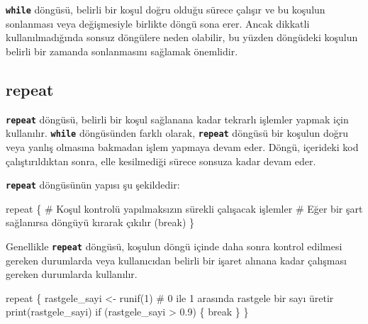 \documentclass[
  letterpaper,
  DIV=11,
  numbers=noendperiod]{scrreprt}
\newenvironment{Shaded}{\begin{snugshade}}{\end{snugshade}}
\newcommand{\CommentTok}[1]{\textcolor[rgb]{0.37,0.37,0.37}{#1}}
\newcommand{\ControlFlowTok}[1]{\textcolor[rgb]{0.00,0.23,0.31}{#1}}
\newcommand{\DecValTok}[1]{\textcolor[rgb]{0.68,0.00,0.00}{#1}}
\newcommand{\FloatTok}[1]{\textcolor[rgb]{0.68,0.00,0.00}{#1}}
\newcommand{\FunctionTok}[1]{\textcolor[rgb]{0.28,0.35,0.67}{#1}}
\newcommand{\NormalTok}[1]{\textcolor[rgb]{0.00,0.23,0.31}{#1}}
\newcommand{\OtherTok}[1]{\textcolor[rgb]{0.00,0.23,0.31}{#1}}
\newcommand{\SpecialCharTok}[1]{\textcolor[rgb]{0.37,0.37,0.37}{#1}}
\begin{document}
\begin{tcolorbox}[enhanced jigsaw, colback=white, coltitle=black, colbacktitle=quarto-callout-warning-color!10!white, opacitybacktitle=0.6, opacityback=0, toprule=.15mm, bottomrule=.15mm, bottomtitle=1mm, rightrule=.15mm, breakable, arc=.35mm, colframe=quarto-callout-warning-color-frame, titlerule=0mm, left=2mm, leftrule=.75mm, toptitle=1mm, title=\textcolor{quarto-callout-warning-color}{\faExclamationTriangle}\hspace{0.5em}{Uyarı}]

\textbf{\texttt{while}} döngüsü, belirli bir koşul doğru olduğu sürece
çalışır ve bu koşulun sonlanması veya değişmesiyle birlikte döngü sona
erer. Ancak dikkatli kullanılmadığında sonsuz döngülere neden olabilir,
bu yüzden döngüdeki koşulun belirli bir zamanda sonlanmasını sağlamak
önemlidir.

\end{tcolorbox}

\subsection{repeat}\label{repeat}

\textbf{\texttt{repeat}} döngüsü, belirli bir koşul sağlanana kadar
tekrarlı işlemler yapmak için kullanılır. \textbf{\texttt{while}}
döngüsünden farklı olarak, \textbf{\texttt{repeat}} döngüsü bir koşulun
doğru veya yanlış olmasına bakmadan işlem yapmaya devam eder. Döngü,
içerideki kod çalıştırıldıktan sonra, elle kesilmediği sürece sonsuza
kadar devam eder.

\textbf{\texttt{repeat}} döngüsünün yapısı şu şekildedir:

\begin{Shaded}
\begin{Highlighting}[]
\ControlFlowTok{repeat}\NormalTok{ \{}
  \CommentTok{\# Koşul kontrolü yapılmaksızın sürekli çalışacak işlemler}
  \CommentTok{\# Eğer bir şart sağlanırsa döngüyü kırarak çıkılır (break)}
\NormalTok{\}}
\end{Highlighting}
\end{Shaded}

Genellikle \textbf{\texttt{repeat}} döngüsü, koşulun döngü içinde daha
sonra kontrol edilmesi gereken durumlarda veya kullanıcıdan belirli bir
işaret alınana kadar çalışması gereken durumlarda kullanılır.

\begin{Shaded}
\begin{Highlighting}[]
\ControlFlowTok{repeat}\NormalTok{ \{}
\NormalTok{  rastgele\_sayi }\OtherTok{\textless{}{-}} \FunctionTok{runif}\NormalTok{(}\DecValTok{1}\NormalTok{)  }\CommentTok{\# 0 ile 1 arasında rastgele bir sayı üretir}
  \FunctionTok{print}\NormalTok{(rastgele\_sayi)}
  \ControlFlowTok{if}\NormalTok{ (rastgele\_sayi }\SpecialCharTok{\textgreater{}} \FloatTok{0.9}\NormalTok{) \{}
    \ControlFlowTok{break}
\NormalTok{  \}}
\NormalTok{\}}
\end{Highlighting}
\end{Shaded}
\end{document}
